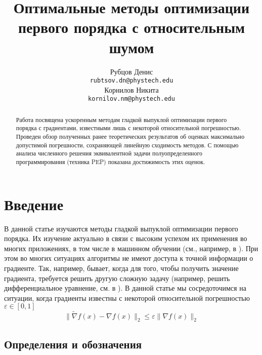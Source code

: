 \documentclass{article}
\title{Оптимальные методы оптимизации первого порядка с относительным шумом}
\author{
	Рубцов Денис \\
	\texttt{rubtsov.dn@phystech.edu} \\
	\And
	Корнилов Никита \\
	\texttt{kornilov.nm@phystech.edu} \\
}
\date{}
\begin{document}
\maketitle

\begin{abstract}
Работа посвящена ускоренным методам гладкой выпуклой оптимизации первого порядка с градиентами, известными лишь с некоторой относительной погрешностью. Проведен обзор полученных ранее теоретических результатов об оценках максимально допустимой погрешности, сохраняющей линейную сходимость методов. С помощью анализа численного решения эквивалентной задачи полуопределенного программирования (техника PEP) показана достижимость этих оценок.

\end{abstract}



\section{\textbf{Введение}}

В данной статье изучаются методы гладкой выпуклой оптимизации первого порядка. Их изучение актуально в связи с высоким успехом их применения во многих приложениях, в том числе в машинном обучении (см., например, в \cite{bottou2007tradeoffs}). При этом во многих ситуациях алгоритмы не имеют доступа к точной информации о градиенте. Так, например, бывает, когда для того, чтобы получить значение градиента, требуется решить другую сложную задачу (например, решить дифференциальное уравнение, см. в \cite{matyukhin2021convex}). В данной статье мы сосредоточимся на ситуации, когда градиенты известны с некоторой относительной погрешностью $\varepsilon \in [0, 1]$ $$\|\widetilde{\nabla} f(x) - \nabla f(x)\|_2 \leq \varepsilon \|\nabla f(x)\|_2$$


\subsection{\textbf{Определения и обозначения}}
\end{document}
